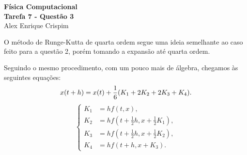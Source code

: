 
\newenvironment{tk3} {
\tikzstyle{loop} = [regular polygon, regular polygon sides=6, shape aspect=0.3, minimum width=1cm, minimum height=1cm, draw,scale=.7, align=center, text width=0.9	cm, fill = blue!15]

\tikzstyle{startstop} = [rectangle, rounded corners, minimum width=3cm, minimum height=.7cm,text centered, draw=black, fill=red!30, text width = 6cm]

\tikzstyle{process} = [rectangle, minimum width=3cm, minimum height=1cm, text centered, draw=black, fill=orange!30, text width = 4cm]

\tikzstyle{processSmall} = [rectangle, minimum width=1cm, minimum height=1cm, text centered, draw=black, fill=orange!30, text width = 2cm]

\tikzstyle{decision} = [diamond, draw, fill=yellow!30,
    text width=4.5em, text badly centered, node distance=3cm, inner sep=0pt]

\tikzstyle{line} = [draw, -latex']

\tikzstyle{cloud} = [draw, ellipse,fill=red!20, node distance=3cm, minimum height=2em, text width = 4cm]

\tikzstyle{io} = [trapezium, trapezium left angle=70, trapezium right angle=-70, text centered, text width = 3.5cm, minimum height=1cm, minimum width=2cm, draw=black, fill=blue!30]

\tikzstyle{arrow} = [thick,->,>=stealth]
\tikzstyle{line} = [draw, -latex']
} {  }


  \begin{center}
    \LARGE \textbf{Física Computacional} \\
    \Large \textbf{Tarefa 7 - Questão 3} \\
    \large Alex Enrique Crispim
  \end{center}

  O método de Runge-Kutta de quarta ordem segue uma ideia semelhante ao caso feito para a questão 2, porém tomando a expansão até quarta ordem.

  Seguindo o mesmo procedimento, com um pouco mais de álgebra, chegamos às seguintes equações:
  \begin{equation}
    x(t+ h) = x(t) + \frac{1}{6} \qty(K_1 + 2K_2 + 2K_3 + K_4).
    \label{eq:1}
  \end{equation}
  \begin{equation}
    \begin{cases}
      K_1 &= h f(t, x) , \\
      K_2 &= h f(t + \frac{1}{2} h, x + \frac{1}{2} K_1), \\
      K_3 &= h f(t + \frac{1}{2} h, x + \frac{1}{2} K_2), \\
      K_4 &= h f(t + h, x + K_3).
    \end{cases}
    \label{eq:2}
  \end{equation}

